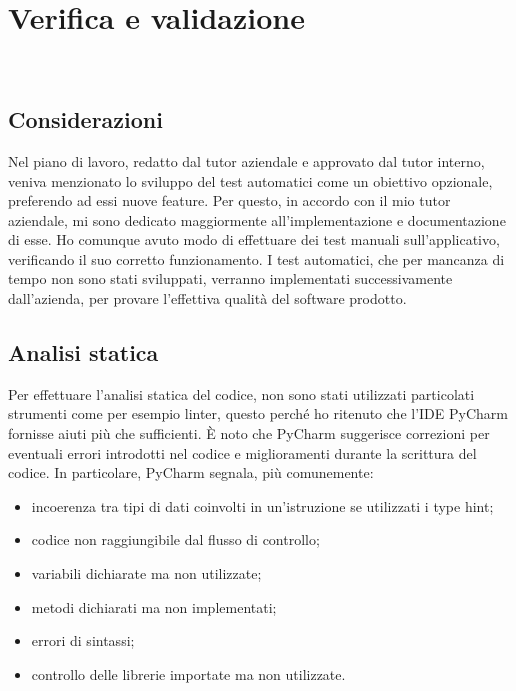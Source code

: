 
\chapter{Verifica e validazione}
\label{cap:verifica-validazione}

\\

\section{Considerazioni}
\label{sec:considerazioni}

Nel piano di lavoro, redatto dal tutor aziendale e approvato dal tutor interno, veniva menzionato lo sviluppo del test automatici come un obiettivo opzionale, preferendo ad essi nuove feature. Per questo, in accordo con il mio tutor aziendale, mi sono dedicato maggiormente all’implementazione e documentazione di esse. Ho comunque avuto modo di effettuare dei test manuali sull’applicativo, verificando il suo corretto funzionamento. I test automatici, che per mancanza di tempo non sono stati sviluppati, verranno implementati successivamente dall’azienda, per provare l’effettiva qualità del software prodotto.

\section{Analisi statica}

Per effettuare l’analisi statica del codice, non sono stati utilizzati particolati strumenti come per esempio linter, questo perché ho ritenuto che l’IDE PyCharm fornisse aiuti più che sufficienti. È noto che PyCharm suggerisce correzioni per eventuali errori introdotti nel codice e miglioramenti durante la scrittura del codice.
In particolare, PyCharm segnala, più comunemente:
\begin{itemize}
	\item incoerenza tra tipi di dati coinvolti in un’istruzione se utilizzati i type hint;
	\item codice non raggiungibile dal flusso di controllo;
	\item variabili dichiarate ma non utilizzate;
	\item metodi dichiarati ma non implementati;
	\item errori di sintassi;
	\item controllo delle librerie importate ma non utilizzate.
\end{itemize}

